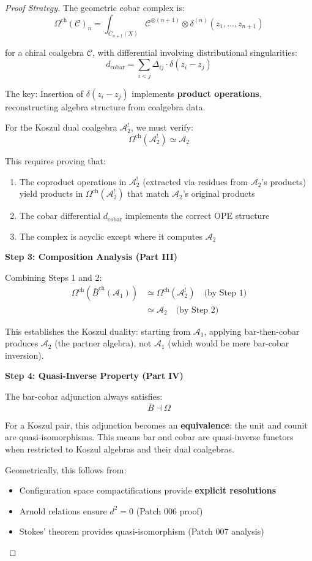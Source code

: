 \begin{proof}[Proof Strategy]
The geometric cobar complex is:
$$\Omega^{\text{ch}}(\mathcal{C})_n = \int_{\overline{C}_{n+1}(X)} \mathcal{C}^{\otimes (n+1)} 
   \otimes \delta^{(n)}(z_1, \ldots, z_{n+1})$$

for a chiral coalgebra $\mathcal{C}$, with differential involving distributional singularities:
$$d_{\text{cobar}} = \sum_{i < j} \Delta_{ij} \cdot \delta(z_i - z_j)$$

The key: Insertion of $\delta(z_i - z_j)$ implements \textbf{product operations}, 
reconstructing algebra structure from coalgebra data.

For the Koszul dual coalgebra $\mathcal{A}_2^!$, we must verify:
$$\Omega^{\text{ch}}(\mathcal{A}_2^!) \simeq \mathcal{A}_2$$

This requires proving that:
\begin{enumerate}
\item The coproduct operations in $\mathcal{A}_2^!$ (extracted via residues from $\mathcal{A}_2$'s 
      products) yield products in $\Omega^{\text{ch}}(\mathcal{A}_2^!)$ that match $\mathcal{A}_2$'s 
      original products
\item The cobar differential $d_{\text{cobar}}$ implements the correct OPE structure
\item The complex is acyclic except where it computes $\mathcal{A}_2$
\end{enumerate}

\textbf{Step 3: Composition Analysis (Part III)}

Combining Steps 1 and 2:
\begin{align*}
\Omega^{\text{ch}}(\bar{B}^{\text{ch}}(\mathcal{A}_1)) 
   &\simeq \Omega^{\text{ch}}(\mathcal{A}_2^!) \quad \text{(by Step 1)} \\
   &\simeq \mathcal{A}_2 \quad \text{(by Step 2)}
\end{align*}

This establishes the Koszul duality: starting from $\mathcal{A}_1$, applying bar-then-cobar 
produces $\mathcal{A}_2$ (the partner algebra), not $\mathcal{A}_1$ (which would be mere 
bar-cobar inversion).

\textbf{Step 4: Quasi-Inverse Property (Part IV)}

The bar-cobar adjunction always satisfies:
$$\bar{B} \dashv \Omega$$

For a Koszul pair, this adjunction becomes an \textbf{equivalence}: the unit and counit 
are quasi-isomorphisms. This means bar and cobar are quasi-inverse functors when restricted 
to Koszul algebras and their dual coalgebras.

Geometrically, this follows from:
\begin{itemize}
\item Configuration space compactifications provide \textbf{explicit resolutions}
\item Arnold relations ensure $d^2 = 0$ (Patch 006 proof)
\item Stokes' theorem provides quasi-isomorphism (Patch 007 analysis)
\end{itemize}
\end{proof}

